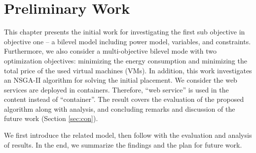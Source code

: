 \chapter{Preliminary Work}\label{C:preliminary}
This chapter presents the initial work for investigating the first sub objective in objective one -- a bilevel model including power model, variables, and constraints. Furthermore, we also consider a multi-objective bilevel mode with two optimization objectives: minimizing the energy consumption and minimizing the total price of the used virtual machines (VMs). In addition, this work investigates an NSGA-II algorithm for solving the initial placement. We consider the web services are deployed in containers. Therefore, ``web service'' is used in the content instead of ``container''.
The result covers the evaluation of the proposed algorithm along with analysis, and concluding remarks and discussion of the future work (Section \ref{sec:con}). 

We first introduce the related model, then follow with the evaluation and analysis of results. In the end, we summarize the findings and the plan for future work.


